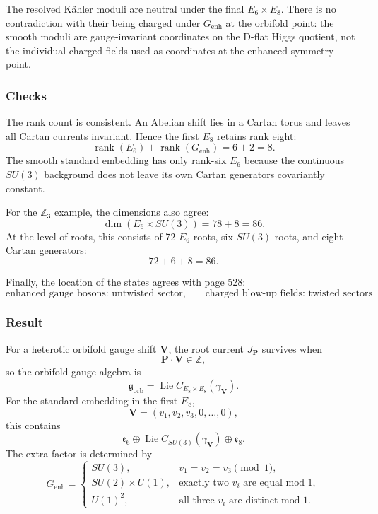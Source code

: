 \documentclass[
  10pt,
  a4paper,
  openany]{book}
\begin{document}
The resolved Kähler moduli are neutral under the final
\(E_6\times E_8\). There is no contradiction with their being charged
under \(G_{\mathrm{enh}}\) at the orbifold point: the smooth moduli are
gauge-invariant coordinates on the D-flat Higgs quotient, not the
individual charged fields used as coordinates at the enhanced-symmetry
point.

\subsubsection{Checks}\label{checks-18}

The rank count is consistent. An Abelian shift lies in a Cartan torus
and leaves all Cartan currents invariant. Hence the first \(E_8\)
retains rank eight: \[
\operatorname{rank}(E_6)
+
\operatorname{rank}(G_{\mathrm{enh}})
=6+2=8.
\] The smooth standard embedding has only rank-six \(E_6\) because the
continuous \(SU(3)\) background does not leave its own Cartan generators
covariantly constant.

For the \(\mathbb Z_3\) example, the dimensions also agree: \[
\dim(E_6\times SU(3))
=78+8
=86.
\] At the level of roots, this consists of 72 \(E_6\) roots, six
\(SU(3)\) roots, and eight Cartan generators: \[
72+6+8=86.
\]

Finally, the location of the states agrees with page 528: \[
\boxed{
\text{enhanced gauge bosons: untwisted sector},
\qquad
\text{charged blow-up fields: twisted sectors}
}.
\]

\subsubsection{Result}\label{result-22}

For a heterotic orbifold gauge shift \(\mathbf V\), the root current
\(J_{\mathbf P}\) survives when \[
\boxed{
\mathbf P\cdot\mathbf V\in\mathbb Z
},
\] so the orbifold gauge algebra is \[
\boxed{
\mathfrak g_{\mathrm{orb}}
=
\operatorname{Lie}
C_{E_8\times E_8}(\gamma_{\mathbf V})
}.
\] For the standard embedding in the first \(E_8\), \[
\mathbf V=(v_1,v_2,v_3,0,\ldots,0),
\] this contains \[
\boxed{
\mathfrak e_6
\oplus
\operatorname{Lie}C_{SU(3)}(\gamma_{\mathbf V})
\oplus
\mathfrak e_8
}.
\] The extra factor is determined by \[
\boxed{
G_{\mathrm{enh}}
=
\begin{cases}
SU(3),&
v_1=v_2=v_3\pmod1,\\
SU(2)\times U(1),&
\text{exactly two }v_i\text{ are equal mod }1,\\
U(1)^2,&
\text{all three }v_i\text{ are distinct mod }1.
\end{cases}
}
\]
\end{document}
